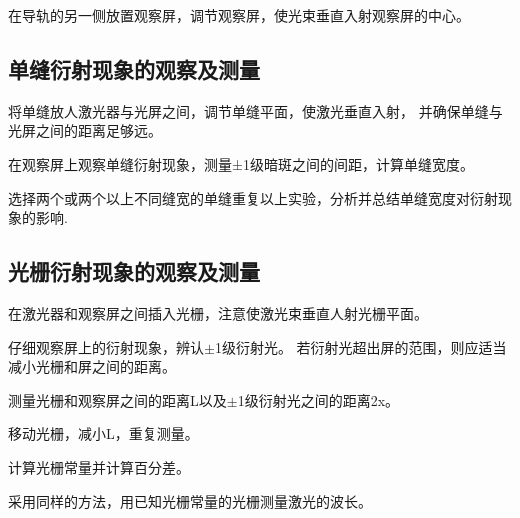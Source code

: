 \documentclass{ctexart}
\begin{document}
   在导轨的另一侧放置观察屏，调节观察屏，使光束垂直入射观察屏的中心。

  \subsection{单缝衍射现象的观察及测量}
   将单缝放人激光器与光屏之间，调节单缝平面，使激光垂直入射，
  并确保单缝与光屏之间的距离足够远。

   在观察屏上观察单缝衍射现象，测量±1级暗斑之间的间距，计算单缝宽度。

   选择两个或两个以上不同缝宽的单缝重复以上实验，分析并总结单缝宽度对衍射现象的影响.
  
  \subsection{光栅衍射现象的观察及测量}
   在激光器和观察屏之间插入光栅，注意使激光束垂直人射光栅平面。

   仔细观察屏上的衍射现象，辨认$\pm$1级衍射光。
  若衍射光超出屏的范围，则应适当减小光栅和屏之间的距离。

   测量光栅和观察屏之间的距离L以及$\pm$1级衍射光之间的距离2x。

   移动光栅，减小L，重复测量。

   计算光栅常量并计算百分差。

   采用同样的方法，用已知光栅常量的光栅测量激光的波长。
\newpage
\end{document}
